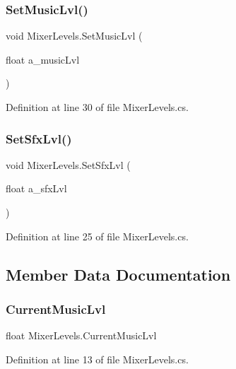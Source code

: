 \subsubsection{\texorpdfstring{Set\+Music\+Lvl()}{SetMusicLvl()}}
{\footnotesize\ttfamily void Mixer\+Levels.\+Set\+Music\+Lvl (\begin{DoxyParamCaption}\item[{float}]{a\+\_\+music\+Lvl }\end{DoxyParamCaption})}



Definition at line 30 of file Mixer\+Levels.\+cs.

\mbox{\label{class_mixer_levels_aa741d24eedb3578c51d9de783ce3da49}} 
\subsubsection{\texorpdfstring{Set\+Sfx\+Lvl()}{SetSfxLvl()}}
{\footnotesize\ttfamily void Mixer\+Levels.\+Set\+Sfx\+Lvl (\begin{DoxyParamCaption}\item[{float}]{a\+\_\+sfx\+Lvl }\end{DoxyParamCaption})}



Definition at line 25 of file Mixer\+Levels.\+cs.



\subsection{Member Data Documentation}
\mbox{\label{class_mixer_levels_a79096ba966c68e6b211bca8246d826a2}} 
\subsubsection{\texorpdfstring{Current\+Music\+Lvl}{CurrentMusicLvl}}
{\footnotesize\ttfamily float Mixer\+Levels.\+Current\+Music\+Lvl}



Definition at line 13 of file Mixer\+Levels.\+cs.

